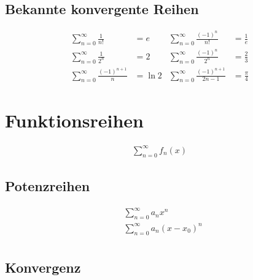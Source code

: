 \subsection{Bekannte konvergente Reihen}


\begin{boxleft}
\end{boxleft}\begin{boxrightshaded}
\begin{align*}
\sum_{n=0}^\infty\frac{1}{n!}&=e&\sum_{n=0}^\infty\frac{\left(-1\right)^n}{n!}&=\frac{1}{e}\\
\sum_{n=0}^\infty\frac{1}{2^n}&=2&\sum_{n=0}^\infty\frac{\left(-1\right)^n}{2^n}&=\frac{2}{3}\\
\sum_{n=0}^\infty\frac{\left(-1\right)^{n+1}}{n}&=\ln2&\sum_{n=0}^\infty\frac{\left(-1\right)^{n+1}}{2n-1}&=\frac{\pi}{4}
\end{align*}
\end{boxrightshaded}

\section{Funktionsreihen}

\begin{boxleft}
\end{boxleft}\begin{boxrightshaded}
\begin{align*}
\sum_{n=0}^\infty f_n(x)
\end{align*}
\end{boxrightshaded}

\subsection{Potenzreihen}

\begin{boxleft}
\end{boxleft}\begin{boxrightshaded}
\begin{align*}
&\sum_{n=0}^\infty a_n x^n\\
&\sum_{n=0}^\infty a_n \left(x-x_0\right)^n\\
\end{align*}
\end{boxrightshaded}

\subsection{Konvergenz}

